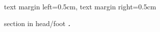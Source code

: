 \setbeamersize
{
    text margin left=0.5cm,
    text margin right=0.5cm
}


\renewcommand{\thesubsection}{\alph{subsection}}
{
  \leavevmode%
  \begin{beamercolorbox}[wd=1.0\paperwidth,ht=2.25ex,dp=1ex,right]{section in head/foot}%
    \textbf{\textit{\thesection.\
    \insertsectionhead\hspace*{2ex}}}
  \end{beamercolorbox}%
  \vskip0pt%
}


